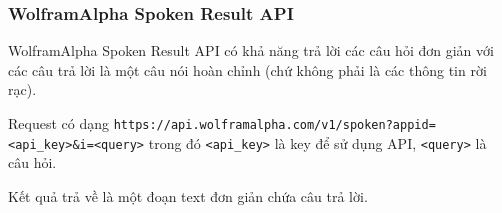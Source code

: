 \subsubsection{WolframAlpha Spoken Result API}

WolframAlpha Spoken Result API có khả năng trả lời các câu hỏi đơn giản với các câu trả lời là một câu nói hoàn chỉnh (chứ không phải là các thông tin rời rạc).

Request có dạng \lstinline{https://api.wolframalpha.com/v1/spoken?appid=<api_key>&i=<query>} trong đó \lstinline{<api_key>} là key để sử dụng API, \lstinline{<query>} là câu hỏi.

Kết quả trả về là một đoạn text đơn giản chứa câu trả lời.
